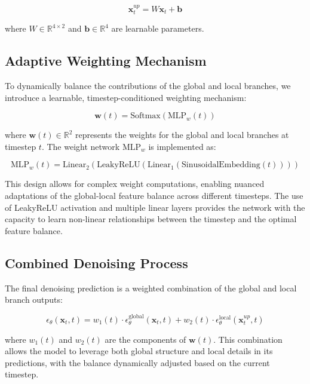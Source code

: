 \documentclass{article} %
\begin{document}
\begin{equation}
    \mathbf{x}_t^{up} = W\mathbf{x}_t + \mathbf{b}
\end{equation}

where $W \in \mathbb{R}^{4 \times 2}$ and $\mathbf{b} \in \mathbb{R}^4$ are learnable parameters.

\subsection{Adaptive Weighting Mechanism}
To dynamically balance the contributions of the global and local branches, we introduce a learnable, timestep-conditioned weighting mechanism:

\begin{equation}
    \mathbf{w}(t) = \text{Softmax}(\text{MLP}_w(t))
\end{equation}

where $\mathbf{w}(t) \in \mathbb{R}^2$ represents the weights for the global and local branches at timestep $t$. The weight network $\text{MLP}_w$ is implemented as:

\begin{equation}
    \text{MLP}_w(t) = \text{Linear}_2(\text{LeakyReLU}(\text{Linear}_1(\text{SinusoidalEmbedding}(t))))
\end{equation}

This design allows for complex weight computations, enabling nuanced adaptations of the global-local feature balance across different timesteps. The use of LeakyReLU activation and multiple linear layers provides the network with the capacity to learn non-linear relationships between the timestep and the optimal feature balance.

\subsection{Combined Denoising Process}
The final denoising prediction is a weighted combination of the global and local branch outputs:

\begin{equation}
    \epsilon_\theta(\mathbf{x}_t, t) = w_1(t) \cdot \epsilon_\theta^{\text{global}}(\mathbf{x}_t, t) + w_2(t) \cdot \epsilon_\theta^{\text{local}}(\mathbf{x}_t^{up}, t)
\end{equation}

where $w_1(t)$ and $w_2(t)$ are the components of $\mathbf{w}(t)$. This combination allows the model to leverage both global structure and local details in its predictions, with the balance dynamically adjusted based on the current timestep.
\end{document}
